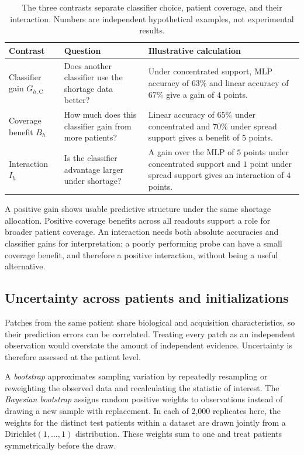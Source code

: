 \documentclass[11pt]{article}
\newcommand{\conc}{\mathrm{C}}
\begin{document}
\begin{table}[htbp]
\centering
\small
\renewcommand{\arraystretch}{1.18}
\begin{tabularx}{\textwidth}{@{}p{}XX@{}}
\toprule
Contrast & Question & Illustrative calculation \\
\midrule
Classifier gain \(G_{h,\conc}\) & Does another classifier use the shortage data better? & Under concentrated support, MLP accuracy of \(63\%\) and linear accuracy of \(67\%\) give a gain of \(4\) points. \\
Coverage benefit \(B_h\) & How much does this classifier gain from more patients? & Linear accuracy of \(65\%\) under concentrated and \(70\%\) under spread support gives a benefit of \(5\) points. \\
Interaction \(I_h\) & Is the classifier advantage larger under shortage? & A gain over the MLP of \(5\) points under concentrated support and \(1\) point under spread support gives an interaction of \(4\) points. \\
\bottomrule
\end{tabularx}
\caption{The three contrasts separate classifier choice, patient coverage, and their interaction. Numbers are independent hypothetical examples, not experimental results.}
\label{tab:contrasts}
\end{table}

\noindent A positive gain shows usable predictive structure under the same shortage allocation. Positive coverage benefits across all readouts support a role for broader patient coverage. An interaction needs both absolute accuracies and classifier gains for interpretation: a poorly performing probe can have a small coverage benefit, and therefore a positive interaction, without being a useful alternative.

\subsection{Uncertainty across patients and initializations}
Patches from the same patient share biological and acquisition characteristics, so their prediction errors can be correlated. Treating every patch as an independent observation would overstate the amount of independent evidence. Uncertainty is therefore assessed at the patient level.

A \emph{bootstrap} approximates sampling variation by repeatedly resampling or reweighting the observed data and recalculating the statistic of interest. The \emph{Bayesian bootstrap} assigns random positive weights to observations instead of drawing a new sample with replacement. In each of 2,000 replicates here, the weights for the distinct test patients within a dataset are drawn jointly from a \(\mathrm{Dirichlet}(1,\ldots,1)\) distribution. These weights sum to one and treat patients symmetrically before the draw.
\end{document}
